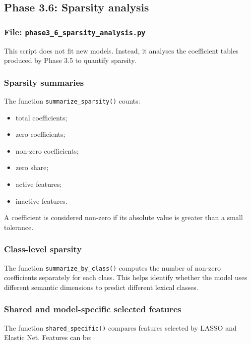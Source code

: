 \documentclass{ipgpmaster}
\begin{document}
\subsection{Phase 3.6: Sparsity analysis}

\subsubsection{File: \texttt{phase3\_6\_sparsity\_analysis.py}}

This script does not fit new models. Instead, it analyses the coefficient tables produced by Phase 3.5 to quantify sparsity.

\subsubsection{Sparsity summaries}

The function \texttt{summarize\_sparsity()} counts:

\begin{itemize}
    \item total coefficients;
    \item zero coefficients;
    \item non-zero coefficients;
    \item zero share;
    \item active features;
    \item inactive features.
\end{itemize}

A coefficient is considered non-zero if its absolute value is greater than a small tolerance.

\subsubsection{Class-level sparsity}

The function \texttt{summarize\_by\_class()} computes the number of non-zero coefficients separately for each class. This helps identify whether the model uses different semantic dimensions to predict different lexical classes.

\subsubsection{Shared and model-specific selected features}

The function \texttt{shared\_specific()} compares features selected by LASSO and Elastic Net. Features can be:
\end{document}

